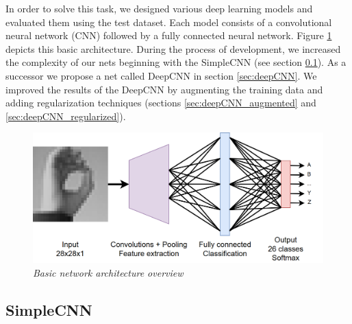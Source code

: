 \documentclass[a4paper]{article}
\begin{document}
In order to solve this task, we designed various deep learning models and evaluated them using the test dataset. Each model consists of a convolutional neural network (CNN) followed by a fully connected neural network. Figure \ref{fig:basic_arch} depicts this basic architecture. During the process of development, we increased the complexity of our nets beginning with the SimpleCNN (see section \ref{sec:simpleCNN}). As a successor we propose a net called  DeepCNN in section \ref{sec:deepCNN}. We improved the results of the DeepCNN by augmenting the training data and adding regularization techniques (sections \ref{sec:deepCNN_augmented} and \ref{sec:deepCNN_regularized}).

\begin{figure}
     \centering
     \includegraphics[width=1\linewidth]{graphics/basic_net_with_text.png}
     \caption{\textit{Basic network architecture overview}}
     \label{fig:basic_arch}
\end{figure}

\subsection{SimpleCNN}\label{sec:simpleCNN}
\end{document}

